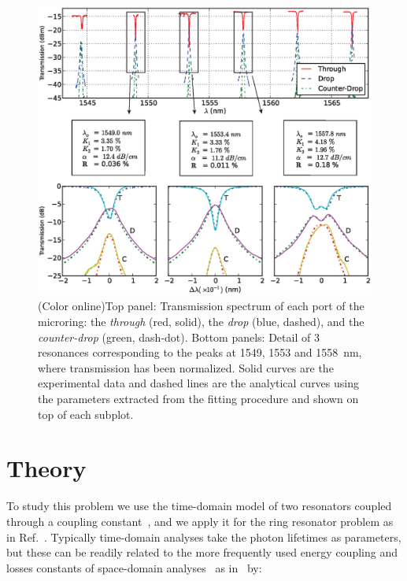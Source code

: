 \documentclass[10pt,letterpaper]{article}
\begin{document}
\begin{figure}[t]
    \centering
    \includegraphics[width=1.0\textwidth]{grafica_negrita_mod_rev4.eps}
    \caption{(Color online)Top panel: Transmission spectrum of each port of the microring: the \emph{through} (red, solid), the \emph{drop} (blue, dashed), and the \emph{counter-drop} (green, dash-dot). Bottom panels: Detail of 3 resonances corresponding to the peaks at 1549, 1553 and 1558~nm, where transmission has been normalized. Solid curves are the experimental data and dashed lines are the analytical curves using the parameters extracted from the fitting procedure and shown on top of each subplot.}

    \label{fig:espectro}

\end{figure}


\section{Theory}
\label{sec:theory}

To study this problem we use the time-domain model of two resonators coupled through a coupling constant~\cite{Haus1984}, and we apply it for the ring resonator problem as in Ref.~\cite{Zhang2008}.
Typically time-domain analyses take the photon lifetimes as parameters, but these can be readily related to the more frequently used energy coupling and losses constants of space-domain analyses~\cite{J.HeebnerR.Grover2008} as in~\cite{Little1997} by:
\end{document}
